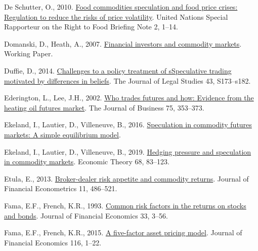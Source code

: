 \documentclass[]{elsarticle} %
\newlength{\cslhangindent}
\newlength{\cslentryspacingunit} %
\newenvironment{CSLReferences}[2] %
 {%
  \setlength{\parindent}{0pt}
  \ifodd #1
  \let\oldpar\par
  \def\par{\hangindent=\cslhangindent\oldpar}
  \fi
  \setlength{\parskip}{#2\cslentryspacingunit}
 }%
 {}
\begin{document}
\begin{CSLReferences}{1}{0}
\leavevmode{}%
De Schutter, O., 2010. \href{https://www2.ohchr.org/english/issues/food/docs/briefing_note_02_september_2010_en.pdf}{Food commodities speculation and food price crises: Regulation to reduce the risks of price volatility}. United Nations Special Rapporteur on the Right to Food Briefing Note 2, 1--14.

\leavevmode{}%
Domanski, D., Heath, A., 2007. \href{https://www.bis.org/publ/qtrpdf/r_qt0703g.pdf}{Financial investors and commodity markets}. Working Paper.

\leavevmode{}%
Duffie, D., 2014. \href{https://doi.org/10.1086/677836}{Challenges to a policy treatment of sSpeculative trading motivated by differences in beliefs}. The Journal of Legal Studies 43, S173--s182.

\leavevmode{}%
Ederington, L., Lee, J.H., 2002. \href{https://doi.org/10.1086/338706}{Who trades futures and how: Evidence from the heating oil futures market}. The Journal of Business 75, 353--373.

\leavevmode{}%
Ekeland, I., Lautier, D., Villeneuve, B., 2016. \href{https://hal.archives-ouvertes.fr/hal-01655848}{Speculation in commodity futures markets: A simple equilibrium model}.

\leavevmode{}%
Ekeland, I., Lautier, D., Villeneuve, B., 2019. \href{https://doi.org/10.1007/s00199-018-1115-y}{Hedging pressure and speculation in commodity markets}. Economic Theory 68, 83--123.

\leavevmode{}%
Etula, E., 2013. \href{https://doi.org/10.1093/jjfinec/nbs024}{Broker-dealer risk appetite and commodity returns}. Journal of Financial Econometrics 11, 486--521.

\leavevmode{}%
Fama, E.F., French, K.R., 1993. \href{https://doi.org/10.1016/0304-405x(93)90023-5}{Common risk factors in the returns on stocks and bonds}. Journal of Financial Economics 33, 3--56.

\leavevmode{}%
Fama, E.F., French, K.R., 2015. \href{https://doi.org/10.1016/j.jfineco.2014.10.010}{A five-factor asset pricing model}. Journal of Financial Economics 116, 1--22.


\end{CSLReferences}
\end{document}
